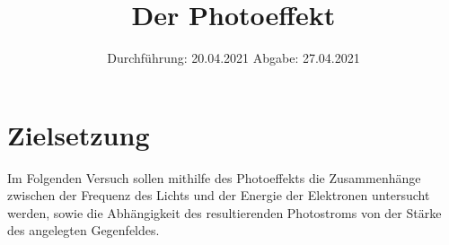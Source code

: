 

\subject{V500}
\title{Der Photoeffekt}
\date{
    Durchführung: 20.04.2021
     \hspace{3em}
    Abgabe: 27.04.2021
}


\maketitle
\thispagestyle{empty}
\tableofcontents
\newpage

\section{Zielsetzung}

    Im Folgenden Versuch sollen mithilfe des Photoeffekts die Zusammenhänge zwischen der Frequenz des Lichts und der 
    Energie der Elektronen untersucht werden, 
    sowie die Abhängigkeit des resultierenden Photostroms von der Stärke des angelegten Gegenfeldes.    


\clearpage


\clearpage


\clearpage


\clearpage






